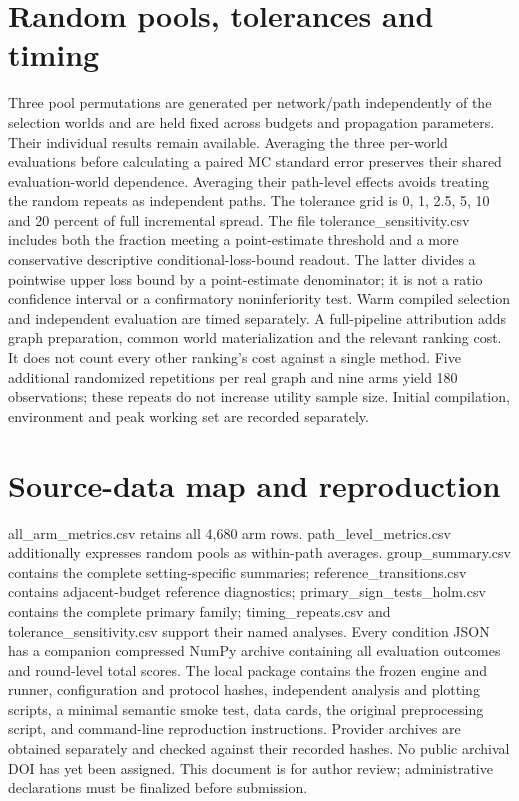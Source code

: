 \documentclass[11pt]{article}
\begin{document}
\section{Random pools, tolerances and timing}
Three pool permutations are generated per network/path independently of the selection worlds and are held fixed across budgets and propagation parameters. Their individual results remain available. Averaging the three per-world evaluations before calculating a paired MC standard error preserves their shared evaluation-world dependence. Averaging their path-level effects avoids treating the random repeats as independent paths.
The tolerance grid is 0, 1, 2.5, 5, 10 and 20 percent of full incremental spread. The file tolerance\_sensitivity.csv includes both the fraction meeting a point-estimate threshold and a more conservative descriptive conditional-loss-bound readout. The latter divides a pointwise upper loss bound by a point-estimate denominator; it is not a ratio confidence interval or a confirmatory noninferiority test.
Warm compiled selection and independent evaluation are timed separately. A full-pipeline attribution adds graph preparation, common world materialization and the relevant ranking cost. It does not count every other ranking's cost against a single method. Five additional randomized repetitions per real graph and nine arms yield 180 observations; these repeats do not increase utility sample size. Initial compilation, environment and peak working set are recorded separately.
\section{Source-data map and reproduction}
all\_arm\_metrics.csv retains all 4,680 arm rows. path\_level\_metrics.csv additionally expresses random pools as within-path averages. group\_summary.csv contains the complete setting-specific summaries; reference\_transitions.csv contains adjacent-budget reference diagnostics; primary\_sign\_tests\_holm.csv contains the complete primary family; timing\_repeats.csv and tolerance\_sensitivity.csv support their named analyses. Every condition JSON has a companion compressed NumPy archive containing all evaluation outcomes and round-level total scores.
The local package contains the frozen engine and runner, configuration and protocol hashes, independent analysis and plotting scripts, a minimal semantic smoke test, data cards, the original preprocessing script, and command-line reproduction instructions. Provider archives are obtained separately and checked against their recorded hashes. No public archival DOI has yet been assigned. This document is for author review; administrative declarations must be finalized before submission.
\end{document}
